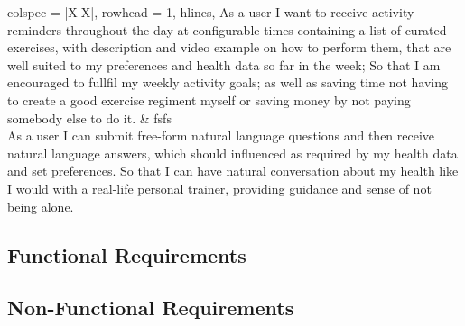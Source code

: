 \begin{longtblr}[
            caption={User Stories},
            label={table:userStories}
        ] {
            colspec = {|X|X|},
            rowhead = 1,
            hlines,
        }
       As a user I want to receive activity reminders throughout the day at configurable times containing a list of curated exercises, with description and video example on how to perform them, that are well suited to my preferences and health data so far in the week; So that I am encouraged to fullfil my weekly activity goals; as well as saving time not having to create a good exercise regiment myself or saving money by not paying somebody else to do it.  
       &
       fsfs 
       \\
       As a user I can submit free-form natural language questions and then receive natural language answers, which should influenced as required by my health data and set preferences. So that I can have natural conversation about my health like I would with a real-life personal trainer, providing guidance and sense of not being alone.
    

        \end{longtblr}


\subsection{Functional Requirements}
\subsection{Non-Functional Requirements}
